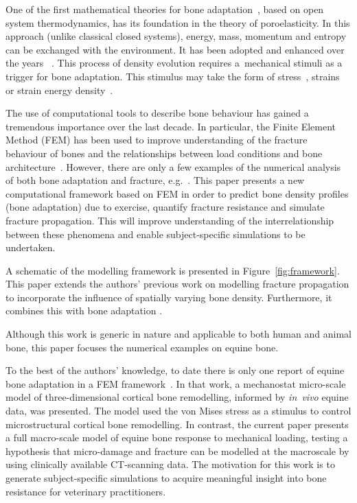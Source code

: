 \documentclass[twocolumn]{svjour3}
\begin{document}
One of the first mathematical theories for bone adaptation~\cite{cowin1976bone}, based on open system thermodynamics, has its foundation in the theory of poroelasticity. 
In this approach (unlike classical closed systems), energy, mass, momentum and entropy can be exchanged with the environment. It has been adopted and enhanced over the years
~\cite{harrigan1996bone, jacobs1995numerical, weinans1992behavior}.
This process of density evolution requires a~mechanical stimuli as a trigger for bone adaptation. This stimulus may take the form of stress~\cite{beaupre1990approach, carter1996mechanical, doblare2002anisotropic}, strains~\cite{cowin1976bone} or strain energy density~\cite{weinans1992behavior, kuhl2003theory,kaczmarczyk2011efficient, Connor2017bone}. 


The use of computational tools to describe bone behaviour has gained a tremendous importance over the last decade. 
In particular, the Finite Element Method (FEM) has been used to improve understanding of the fracture behaviour of bones and the relationships between load conditions and bone architecture~\cite{podshivalov2014road, poelert2013patient}. However, there are only a few examples of the numerical analysis of both bone adaptation and fracture, e.g.~\cite{hambli2013integrated}. This paper presents a new computational framework based on FEM in order to predict bone density profiles 
(bone adaptation) due to exercise, quantify fracture resistance and simulate fracture propagation. This will improve understanding of the interrelationship between these phenomena and enable subject-specific simulations to be undertaken.

A schematic of the modelling framework is presented in Figure~\ref{fig:framework}. This paper extends the authors' previous work on modelling fracture propagation \cite{kaczmarczyk2014three,kaczmarczyk2017energy} to incorporate the influence of spatially varying bone density. Furthermore, it combines this with bone adaptation \cite{kaczmarczyk2011efficient,lewandowski2017}. 

Although this work is generic in nature and applicable to both human and animal bone, this paper focuses the numerical examples on equine bone. 

To the best of the authors' knowledge, to date there is only one report of equine bone adaptation in a FEM framework~\cite{Wang2016}. 
In that work, a mechanostat micro-scale model of three-dimensional cortical bone remodelling, informed by \emph{in~vivo} equine data, was presented. 
The model used the von Mises stress as a stimulus to control microstructural cortical bone remodelling.
In contrast, the current paper presents a full macro-scale model of equine bone response to mechanical loading, testing a hypothesis that micro-damage and fracture can be modelled at the macroscale by using clinically available CT-scanning data.
The motivation for this work is to generate subject-specific simulations to acquire meaningful insight into bone resistance
 for veterinary practitioners.
\end{document}
